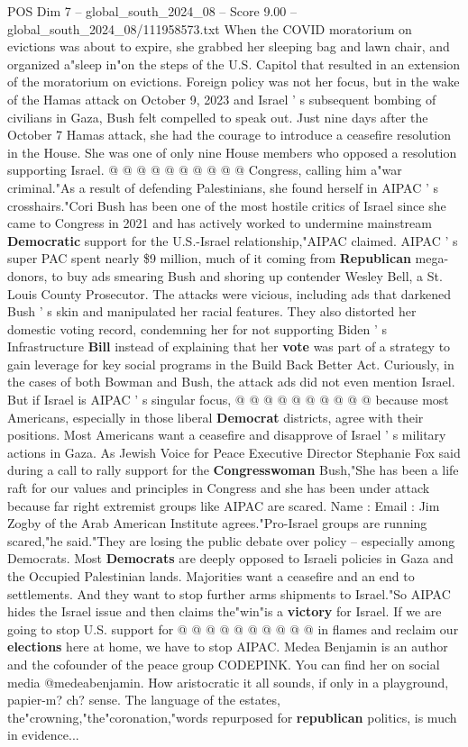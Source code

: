 \begin{textsample}{POS Dim 7 – global\_south\_2024\_08 – Score 9.00 – global\_south\_2024\_08/111958573.txt}
When the COVID moratorium on evictions was about to expire, she grabbed her sleeping bag and lawn chair, and organized a"sleep in"on the steps of the U.S.
Capitol that resulted in an extension of the moratorium on evictions.
Foreign policy was not her focus, but in the wake of the Hamas attack on October 9, 2023 and Israel ' s subsequent bombing of civilians in Gaza, Bush felt compelled to speak out.
Just nine days after the October 7 Hamas attack, she had the courage to introduce a ceasefire resolution in the House.
She was one of only nine House members who opposed a resolution supporting Israel. @ @ @ @ @ @ @ @ @ @ Congress, calling him a"war criminal."As a result of defending Palestinians, she found herself in AIPAC ' s crosshairs."Cori Bush has been one of the most hostile critics of Israel since she came to Congress in 2021 and has actively worked to undermine mainstream \textbf{Democratic} support for the U.S.-Israel relationship,"AIPAC claimed.
AIPAC ' s super PAC spent nearly \$9 million, much of it coming from \textbf{Republican} mega-donors, to buy ads smearing Bush and shoring up contender Wesley Bell, a St.
Louis County Prosecutor.
The attacks were vicious, including ads that darkened Bush ' s skin and manipulated her racial features.
They also distorted her domestic voting record, condemning her for not supporting Biden ' s Infrastructure \textbf{Bill} instead of explaining that her \textbf{vote} was part of a strategy to gain leverage for key social programs in the Build Back Better Act.
Curiously, in the cases of both Bowman and Bush, the attack ads did not even mention Israel.
But if Israel is AIPAC ' s singular focus, @ @ @ @ @ @ @ @ @ @ because most Americans, especially in those liberal \textbf{Democrat} districts, agree with their positions.
Most Americans want a ceasefire and disapprove of Israel ' s military actions in Gaza.
As Jewish Voice for Peace Executive Director Stephanie Fox said during a call to rally support for the \textbf{Congresswoman} Bush,"She has been a life raft for our values and principles in Congress and she has been under attack because far right extremist groups like AIPAC are scared.
Name : Email : Jim Zogby of the Arab American Institute agrees."Pro-Israel groups are running scared,"he said."They are losing the public debate over policy -- especially among Democrats.
Most \textbf{Democrats} are deeply opposed to Israeli policies in Gaza and the Occupied Palestinian lands.
Majorities want a ceasefire and an end to settlements.
And they want to stop further arms shipments to Israel."So AIPAC hides the Israel issue and then claims the"win"is a \textbf{victory} for Israel.
If we are going to stop U.S. support for @ @ @ @ @ @ @ @ @ @ in flames and reclaim our \textbf{elections} here at home, we have to stop AIPAC.
Medea Benjamin is an author and the cofounder of the peace group CODEPINK.
You can find her on social media @medeabenjamin.
How aristocratic it all sounds, if only in a playground, papier-m? ch? sense.
The language of the estates, the"crowning,"the"coronation,"words repurposed for \textbf{republican} politics, is much in evidence...


\end{textsample}
